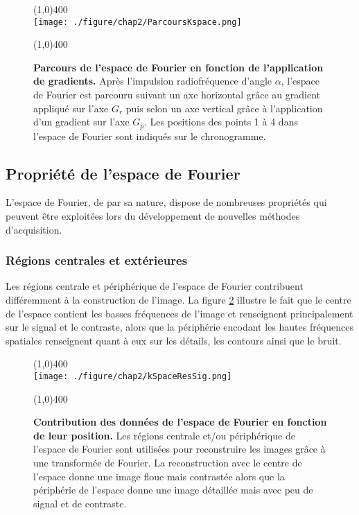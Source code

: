 \begin{figure}[H]
\centering
\line(1,0){400} \\
\texttt{[image: ./figure/chap2/ParcoursKspace.png]}
\caption[Parcours de l'espace de Fourier en fonction de l'application de gradients.]{\label{fig:ParcoursKspace} \textbf{Parcours de l'espace de Fourier en fonction de l'application de gradients.} Après l'impulsion radiofréquence d'angle $\alpha$, l'espace de Fourier est parcouru suivant un axe horizontal grâce au gradient appliqué sur l'axe $G_r$ puis selon un axe vertical grâce à l'application d'un gradient sur l'axe $G_p$. Les positions des points 1 à 4 dans l'espace de Fourier sont indiqués sur le chronogramme.}
\line(1,0){400} \\
\end{figure}


\subsection{Propriété de l'espace de Fourier}

L'espace de Fourier, de par sa nature, dispose de nombreuses propriétés qui peuvent être exploitées lors du développement de nouvelles méthodes d'acquisition. 

\subsubsection{Régions centrales et extérieures}
\label{subsec:KSpaceRegion}
Les régions centrale et périphérique de l'espace de Fourier contribuent différemment à la construction de l'image. La figure \ref{fig:kSpaceResSig} illustre le fait que le centre de l'espace contient les basses fréquences de l'image et renseignent principalement sur le signal et le contraste, alors que la périphérie encodant les hautes fréquences spatiales renseignent quant à eux sur les détails, les contours ainsi que le bruit.

\begin{figure}[H]
\centering
\line(1,0){400} \\
\texttt{[image: ./figure/chap2/kSpaceResSig.png]}
\caption[Contribution des données de l'espace de Fourier en fonction de leur position.]{\label{fig:kSpaceResSig} \textbf{Contribution des données de l'espace de Fourier en fonction de leur position.} Les régions centrale et/ou périphérique de l'espace de Fourier sont utilisées pour reconstruire les images grâce à une transformée de Fourier. La reconstruction avec le centre de l'espace donne une image floue mais contrastée alors que la périphérie de l'espace donne une image détaillée mais avec peu de signal et de contraste.}
\line(1,0){400} \\
\end{figure}

